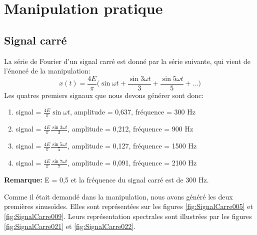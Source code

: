 \documentclass[a4paper]{article}
\begin{document}
\section{Manipulation pratique}










\subsection{Signal carré}





La série de Fourier d'un signal carré est donné par la série suivante, qui vient de l'énoncé de la manipulation:
\[ x(t) = \frac{4E}{\pi} \bigg( \sin \omega t + \frac{\sin 3 \omega t}{3} + \frac{\sin 5 \omega t}{5} + ... \bigg) \]
Les quatres premiers signaux que nous devons générer sont donc:
\begin{enumerate}
    \item signal = $\displaystyle \frac{4E}{\pi} \sin \omega t $, amplitude = 0,637, fréquence = 300 Hz
    \item signal = $\displaystyle \frac{4E}{\pi} \frac{\sin 3 \omega t}{3} $, amplitude = 0,212, fréquence = 900 Hz
    \item signal = $\displaystyle \frac{4E}{\pi} \frac{\sin 5 \omega t}{5} $, amplitude = 0,127, fréquence = 1500 Hz
    \item signal = $\displaystyle \frac{4E}{\pi} \frac{\sin 7 \omega t}{7} $, amplitude = 0,091, fréquence = 2100 Hz
\end{enumerate}
\textbf{Remarque:} E = 0,5 et la fréquence du signal carré est de 300 Hz.






Comme il était demandé dans la manipulation, nous avons généré les deux premières sinusoïdes. Elles sont représentées sur les figures \ref{fig:SignalCarre005} et \ref{fig:SignalCarre009}. Leurs représentation spectrales sont illustrées par les figures \ref{fig:SignalCarre021} et \ref{fig:SignalCarre022}.

\end{document}
